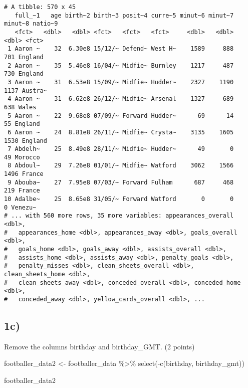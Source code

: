 \documentclass[
]{article}
\newenvironment{Shaded}{\begin{snugshade}}{\end{snugshade}}
\newcommand{\FunctionTok}[1]{\textcolor[rgb]{0.00,0.00,0.00}{#1}}
\newcommand{\NormalTok}[1]{#1}
\newcommand{\OtherTok}[1]{\textcolor[rgb]{0.56,0.35,0.01}{#1}}
\newcommand{\SpecialCharTok}[1]{\textcolor[rgb]{0.00,0.00,0.00}{#1}}
\begin{document}
\begin{verbatim}
# A tibble: 570 x 45
   full_~1   age birth~2 birth~3 posit~4 curre~5 minut~6 minut~7 minut~8 natio~9
   <fct>   <dbl>   <dbl> <fct>   <fct>   <fct>     <dbl>   <dbl>   <dbl> <fct>  
 1 Aaron ~    32  6.30e8 15/12/~ Defend~ West H~    1589     888     701 England
 2 Aaron ~    35  5.46e8 16/04/~ Midfie~ Burnley    1217     487     730 England
 3 Aaron ~    31  6.53e8 15/09/~ Midfie~ Hudder~    2327    1190    1137 Austra~
 4 Aaron ~    31  6.62e8 26/12/~ Midfie~ Arsenal    1327     689     638 Wales  
 5 Aaron ~    22  9.68e8 07/09/~ Forward Hudder~      69      14      55 England
 6 Aaron ~    24  8.81e8 26/11/~ Midfie~ Crysta~    3135    1605    1530 England
 7 Abdelh~    25  8.49e8 28/11/~ Midfie~ Hudder~      49       0      49 Morocco
 8 Abdoul~    29  7.26e8 01/01/~ Midfie~ Watford    3062    1566    1496 France 
 9 Abouba~    27  7.95e8 07/03/~ Forward Fulham      687     468     219 France 
10 Adalbe~    25  8.65e8 31/05/~ Forward Watford       0       0       0 Venezu~
# ... with 560 more rows, 35 more variables: appearances_overall <dbl>,
#   appearances_home <dbl>, appearances_away <dbl>, goals_overall <dbl>,
#   goals_home <dbl>, goals_away <dbl>, assists_overall <dbl>,
#   assists_home <dbl>, assists_away <dbl>, penalty_goals <dbl>,
#   penalty_misses <dbl>, clean_sheets_overall <dbl>, clean_sheets_home <dbl>,
#   clean_sheets_away <dbl>, conceded_overall <dbl>, conceded_home <dbl>,
#   conceded_away <dbl>, yellow_cards_overall <dbl>, ...
\end{verbatim}

\hypertarget{c}{%
\subsection{1c)}\label{c}}

Remove the columns birthday and birthday\_GMT. (2 points)

\begin{Shaded}
\begin{Highlighting}[]
\NormalTok{footballer\_data2 }\OtherTok{\textless{}{-}}
\NormalTok{  footballer\_data }\SpecialCharTok{\%\textgreater{}\%}
  \FunctionTok{select}\NormalTok{(}\SpecialCharTok{{-}}\FunctionTok{c}\NormalTok{(birthday, birthday\_gmt))}

\NormalTok{footballer\_data2}
\end{Highlighting}
\end{Shaded}
\end{document}
